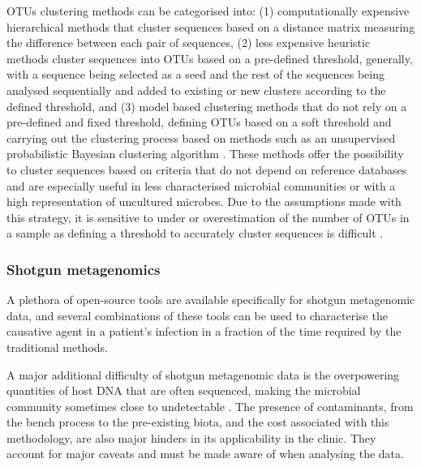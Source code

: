 \ac{OTUs} clustering methods can be categorised into: (1) computationally expensive hierarchical methods that cluster sequences based on a distance matrix measuring the difference between each pair of sequences, (2) less expensive heuristic methods cluster sequences into \ac{OTUs} based on a pre-defined threshold, generally, with a sequence being selected as a seed and the rest of the sequences being analysed sequentially and added to existing or new clusters according to the defined threshold, and (3) model based clustering methods that do not rely on a pre-defined and fixed threshold, defining \ac{OTUs} based on a soft threshold and carrying out the clustering process based on methods such as an unsupervised probabilistic Bayesian clustering algorithm \citep{hao_clustering_2011}. These methods offer the possibility to cluster sequences based on criteria that do not depend on reference databases and are especially useful in less characterised microbial communities or with a high representation of uncultured microbes. Due to the assumptions made with this strategy, it is sensitive to under or overestimation of the number of \ac{OTUs} in a sample as defining a threshold to accurately cluster sequences is difficult \citep{westcott_novo_2015}.

\subsubsection{Shotgun metagenomics} \label{ssec:_intro_shotgun_metagenomics_bioinfo}

A plethora of open-source tools are available specifically for shotgun metagenomic data, and several combinations of these tools can be used to characterise the causative agent in a patient's infection in a fraction of the time required by the traditional methods. 

A major additional difficulty of shotgun metagenomic data is the overpowering quantities of host DNA that are often sequenced, making the microbial community sometimes close to undetectable \citep{couto_critical_2018}.
The presence of contaminants, from the bench process to the pre-existing biota, and the cost associated with this methodology, are also major hinders in its applicability in the clinic.
They account for major caveats and must be made aware of when analysing the data.

